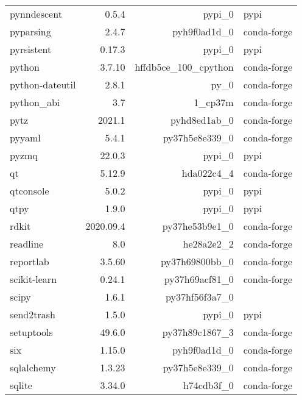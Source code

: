 \begin{table}
\begin{center}
\begin{tabular}{|l|r|r|l|}
			pynndescent &0.5.4 & pypi\_0 &pypi \\
			pyparsing &2.4.7 & pyh9f0ad1d\_0 &conda-forge \\
			pyrsistent &0.17.3 & pypi\_0 &pypi \\
			python &3.7.10 & hffdb5ce\_100\_cpython &conda-forge \\
			python-dateutil &2.8.1 & py\_0 &conda-forge \\
			python\_abi &3.7 & 1\_cp37m &conda-forge \\
			pytz &2021.1 & pyhd8ed1ab\_0 &conda-forge \\
			pyyaml &5.4.1 & py37h5e8e339\_0 &conda-forge \\
			pyzmq &22.0.3 & pypi\_0 &pypi \\
			qt &5.12.9 & hda022c4\_4 &conda-forge \\
			qtconsole &5.0.2 & pypi\_0 &pypi \\
			qtpy &1.9.0 & pypi\_0 &pypi \\
			rdkit &2020.09.4 & py37he53b9e1\_0 &conda-forge \\
			readline &8.0 & he28a2e2\_2 &conda-forge \\
			reportlab &3.5.60 & py37h69800bb\_0 &conda-forge \\
			scikit-learn &0.24.1 & py37h69acf81\_0 &conda-forge \\
			scipy &1.6.1 & py37hf56f3a7\_0 & \\
			send2trash &1.5.0 & pypi\_0 &pypi \\
			setuptools &49.6.0 & py37h89c1867\_3 &conda-forge \\
			six &1.15.0 & pyh9f0ad1d\_0 &conda-forge \\
			sqlalchemy &1.3.23 & py37h5e8e339\_0 &conda-forge \\
			sqlite &3.34.0 & h74cdb3f\_0 &conda-forge \\
			
		\end{tabular}
	\end{center}
\end{table}	

